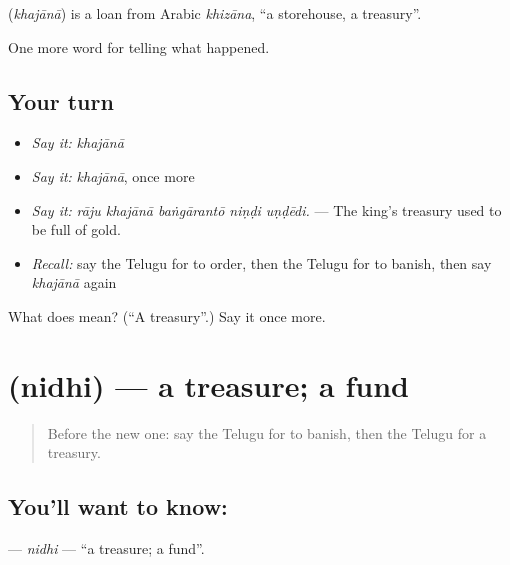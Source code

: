 \begin{cousinweb}
\textbf{} (\emph{khajānā}) is a loan from Arabic \emph{khizāna}, \textquotedblleft{}a storehouse, a treasury\textquotedblright{}.
\end{cousinweb}

\begin{grammarlens}[title={What you've built}]
One more word for telling what happened.
\end{grammarlens}

\subsection*{Your turn}
\begin{itemize}
\raggedright
  \item \emph{Say it:} \emph{khajānā}
  \item \emph{Say it:} \emph{khajānā}, once more
  \item \emph{Say it:} \emph{rāju khajānā baṅgārantō niṇḍi uṇḍēdi.} — The king's treasury used to be full of gold.
  \item \emph{Recall:} say the Telugu for to order, then the Telugu for to banish, then say \emph{khajānā} again
\end{itemize}

\begin{tcolorbox}[breakable,colback=teal!4,colframe=teal!35!black,title={Before you move on}]
What does  mean? (\textquotedblleft{}A treasury\textquotedblright{}.) Say it once more.
\end{tcolorbox}
\section[\texorpdfstring{\te{నిధి} (nidhi)}{నిధి (nidhi)}]{ (nidhi) — a treasure; a fund}

\label{lesson:TE-C366-nidhi}



\begin{quote}
Before the new one: say the Telugu for to banish, then the Telugu for a treasury.
\end{quote}

\subsection*{You'll want to know: }
\textbf{} — \emph{nidhi} — \textquotedblleft{}a treasure; a fund\textquotedblright{}.

